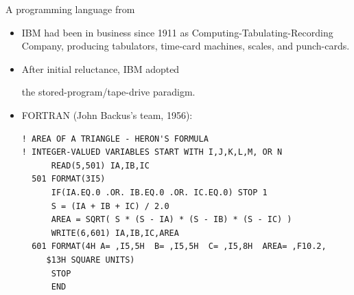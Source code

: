 \documentclass[aspectratio=169]{beamer}
\begin{document}
\begin{frame}[fragile]{A programming language from }
\vspace{0.3 cm}
\begin{itemize}\setlength{\itemsep}{0.35 cm}
\item IBM had been in business since 1911 as Computing-Tabulating-Recording Company, producing tabulators, time-card machines, scales, and punch-cards.

\vspace{0.25 cm}


\vspace{-5.25 cm}

\item<2-> After initial reluctance, IBM adopted

the stored-program/tape-drive paradigm.

\item<3-> FORTRAN (John Backus's team, 1956):

\vspace{0.25 cm}
\hspace{-1 cm}\begin{minipage}{0.5\linewidth}
\tiny
\begin{verbatim}
! AREA OF A TRIANGLE - HERON'S FORMULA
! INTEGER-VALUED VARIABLES START WITH I,J,K,L,M, OR N
      READ(5,501) IA,IB,IC
  501 FORMAT(3I5)
      IF(IA.EQ.0 .OR. IB.EQ.0 .OR. IC.EQ.0) STOP 1
      S = (IA + IB + IC) / 2.0
      AREA = SQRT( S * (S - IA) * (S - IB) * (S - IC) )
      WRITE(6,601) IA,IB,IC,AREA
  601 FORMAT(4H A= ,I5,5H  B= ,I5,5H  C= ,I5,8H  AREA= ,F10.2,
     $13H SQUARE UNITS)
      STOP
      END
\end{verbatim}
\end{minipage}

\vspace{0.25 cm}
\end{itemize}
\end{frame}
\end{document}
